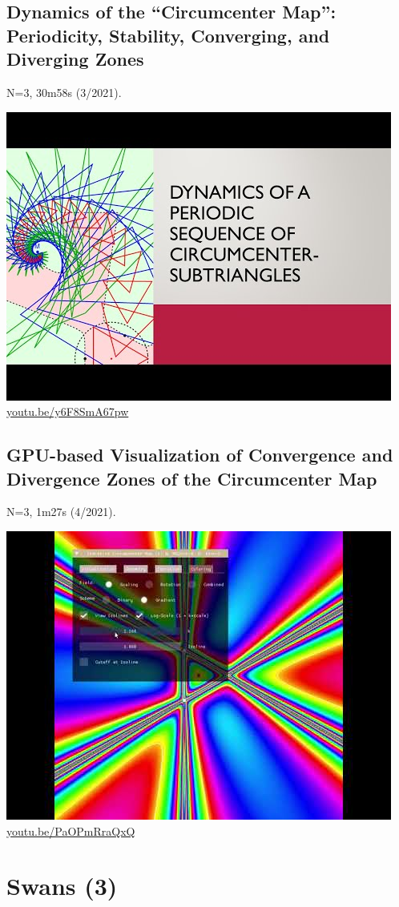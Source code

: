 \documentclass[12pt]{amsart}
\begin{document}
\subsection{Dynamics of the ``Circumcenter Map'': Periodicity, Stability, Converging, and Diverging Zones}
\label{vid:y6F8SmA67pw}
\noindent N=3, 30m58s (3/2021). 
\begin{center}\includegraphics[width=.5\textwidth]{pics/y6F8SmA67pw.jpg} \\ 
\href{https://youtu.be/y6F8SmA67pw}{\url{youtu.be/y6F8SmA67pw}}\end{center}
% 

\subsection{GPU-based Visualization of Convergence and Divergence Zones of the Circumcenter Map}
\label{vid:PaOPmRraQxQ}
\noindent N=3, 1m27s (4/2021). 
\begin{center}\includegraphics[width=.5\textwidth]{pics/PaOPmRraQxQ.jpg} \\ 
\href{https://youtu.be/PaOPmRraQxQ}{\url{youtu.be/PaOPmRraQxQ}}\end{center}
% 


\section{Swans (3)}
\end{document}
